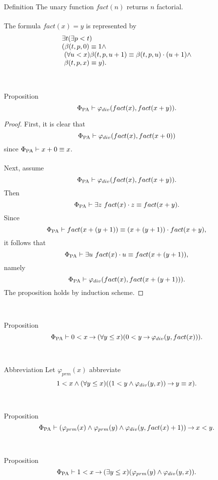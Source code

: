 \begin{definition}{Definition} The unary function $fact(n)$ returns $n$ factorial.\\
\ \\
The formula $fact(x) \equal y$ is represented by
\[
\begin{array}{l}
\exists t(\exists p < t) \cr
(\beta(t, p, 0) \equiv 1 \land \cr
\ (\forall u < x)\beta(t, p, u + 1) \equiv \beta(t, p, u) \cdot (u + 1) \land \cr
\ \beta(t, p, x) \equiv y).
\end{array}
\]
\end{definition}\ \\
\begin{theorem}{Proposition}
\[
\Phi_{\mathrm{PA}} \vdash \varphi_{div}(fact(x), fact(x + y)).
\]
\end{theorem}
\begin{proof}
First, it is clear that
\[
\Phi_{\mathrm{PA}} \vdash \varphi_{div}(fact(x), fact(x + 0))
\]
since $\Phi_{\mathrm{PA}} \vdash x + 0 \equiv x$.\\
\ \\
Next, assume
\[
\Phi_{\mathrm{PA}} \vdash \varphi_{div}(fact(x), fact(x + y)).
\]
Then
\[
\Phi_{\mathrm{PA}} \vdash \exists z \ fact(x) \cdot z \equiv fact(x + y).
\]
Since
\[
\Phi_{\mathrm{PA}} \vdash fact(x + (y + 1)) \equiv (x + (y + 1)) \cdot fact(x + y),
\]
it follows that
\[
\Phi_{\mathrm{PA}} \vdash \exists u \ fact(x) \cdot u \equiv fact(x + (y + 1)),
\]
namely
\[
\Phi_{\mathrm{PA}} \vdash \varphi_{div}(fact(x), fact(x + (y + 1))).
\]
The proposition holds by induction scheme.
\end{proof}\ \\
\begin{theorem}{Proposition}
\[
\Phi_{\mathrm{PA}} \vdash 0 < x \mathbin{\rightarrow} (\forall y \leq x)(0 < y \mathbin{\rightarrow} \varphi_{div}(y, fact(x))).
\]
\end{theorem}\ \\
\begin{definition}{Abbreviation}
Let $\varphi_{prm}(x)$ abbreviate
\[
1 < x \land (\forall y \leq x)((1 < y \land \varphi_{div}(y, x)) \mathbin{\rightarrow} y \equiv x).
\]
\end{definition}\ \\
\begin{theorem}{Proposition}
\[
\Phi_{\mathrm{PA}} \vdash (\varphi_{prm}(x) \land \varphi_{prm}(y) \land \varphi_{div}(y, fact(x) + 1)) \mathbin{\rightarrow} x < y.
\]
\end{theorem}\ \\
\begin{theorem}{Proposition}
\[
\Phi_{\mathrm{PA}} \vdash 1 < x \mathbin{\rightarrow} (\exists y \leq x)(\varphi_{prm}(y) \land \varphi_{div}(y, x)).
\]
\end{theorem}\ \\
